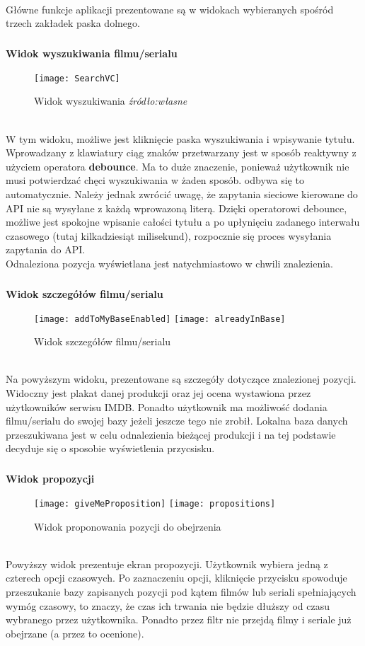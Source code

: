 \documentclass[12pt,oneside,a4paper]{report}
\begin{document}
\paragraph{}Główne funkcje aplikacji prezentowane są w widokach wybieranych spośród trzech zakładek paska dolnego.
\subparagraph{}\textbf{Widok wyszukiwania filmu/serialu}
\begin{figure}[ht!]
	\centering
	\texttt{[image: SearchVC]}
	\caption{Widok wyszukiwania
		\textit{źródło:własne}}
	\label{SearchVC}
\end{figure}\\
W tym widoku, możliwe jest kliknięcie paska wyszukiwania i wpisywanie tytułu. Wprowadzany z klawiatury ciąg znaków przetwarzany jest w sposób reaktywny z użyciem operatora \textbf{debounce}. Ma to duże znaczenie, ponieważ użytkownik nie musi potwierdzać chęci wyszukiwania w żaden sposób. odbywa się to automatycznie. Należy jednak zwrócić uwagę, że zapytania sieciowe kierowane do API nie są wysyłane z każdą wprowazoną literą. Dzięki operatorowi debounce, możliwe jest spokojne wpisanie całości tytułu a po upłynięciu zadanego interwału czasowego (tutaj kilkadziesiąt milisekund), rozpocznie się proces wysyłania zapytania do API.\\
Odnaleziona pozycja wyświetlana jest natychmiastowo w chwili znalezienia.
\subparagraph{}\textbf{Widok szczegółów filmu/serialu}
\begin{figure}[ht!]
	\centering
	\subfloat[]{}
	\texttt{[image: addToMyBaseEnabled]}
	\quad
	\subfloat[]{}
	\texttt{[image: alreadyInBase]}
	\caption{Widok szczegółów  filmu/serialu}
	\label{watchableDetails}
\end{figure}\\
Na powyższym widoku, prezentowane są szczegóły dotyczące znalezionej pozycji. Widoczny jest plakat danej produkcji oraz jej ocena wystawiona przez użytkowników serwisu IMDB. Ponadto użytkownik ma możliwość dodania filmu/serialu do swojej bazy jeżeli jeszcze tego nie zrobił. Lokalna baza danych przeszukiwana jest w celu odnalezienia bieżącej produkcji i na tej podstawie decyduje się o sposobie wyświetlenia przycsisku.
\pagebreak
\subparagraph{}\textbf{Widok propozycji}
\begin{figure}[ht!]
	\centering
	\subfloat[]{}
	\texttt{[image: giveMeProposition]}
	\quad
	\subfloat[]{}
	\texttt{[image: propositions]}
	\caption{Widok proponowania pozycji do obejrzenia}
	\label{proposition}
\end{figure}\\
Powyższy widok prezentuje ekran propozycji. Użytkownik wybiera jedną z czterech opcji czasowych. Po zaznaczeniu opcji, kliknięcie przycisku spowoduje przeszukanie bazy zapisanych pozycji pod kątem filmów lub seriali spełniających wymóg czasowy, to znaczy, że czas ich trwania nie będzie dłuższy od czasu wybranego przez użytkownika. Ponadto przez filtr nie przejdą filmy i seriale już obejrzane (a przez to ocenione). 
\end{document}
